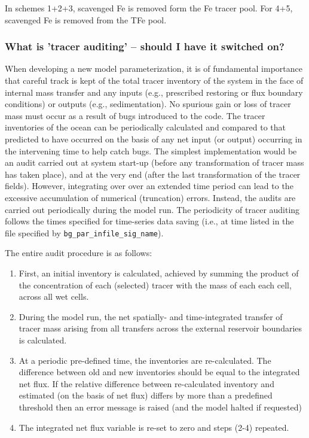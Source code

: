 \documentclass[11pt,fleqn]{book} %
\begin{document}
In schemes 1+2+3, scavenged Fe is removed form the Fe tracer pool. For 4+5, scavenged Fe is removed from the TFe pool.


%
\subsubsection{What is 'tracer auditing' -- should I have it switched on?}

When developing a new model parameterization, it is of fundamental importance that careful track is kept of the total tracer inventory of the system in the face of internal mass transfer and any inputs (e.g., prescribed restoring or flux boundary conditions) or outputs (e.g., sedimentation). No spurious gain or loss of tracer mass must occur as a result of bugs introduced to the code. The tracer inventories of the ocean can be periodically calculated and compared to that predicted to have occurred on the basis of any net input (or output) occurring in the intervening time to help catch bugs. The simplest implementation would be an audit carried out at system start-up (before any transformation of tracer mass has taken place), and at the very end (after the last transformation of the tracer fields). However, integrating over over an extended time period can lead to the excessive accumulation of numerical (truncation) errors. Instead, the audits are carried out periodically during the model run. The periodicity of tracer auditing follows the times specified for time-series data saving (i.e., at time listed in the file specified by \texttt{bg\_par\_infile\_sig\_name}).

The entire audit procedure is as follows:

\begin{enumerate}[noitemsep]
\setlength{\itemindent}{.2in}

\item First, an initial inventory is calculated, achieved by summing the product of the concentration of each (selected) tracer with the mass of each each cell, across all wet cells.
\item During the model run, the net spatially- and time-integrated transfer of tracer mass arising from all transfers across the external reservoir boundaries is calculated. 
\item At a periodic pre-defined time, the inventories are re-calculated. The difference between old and new inventories should be equal to the integrated net flux. If the relative difference between re-calculated inventory and estimated (on the basis of net flux) differs by more than a predefined threshold then an error message is raised (and the model halted if requested)
\item The integrated net flux variable is re-set to zero and steps (2-4) repeated.

\end{enumerate}
\end{document}
